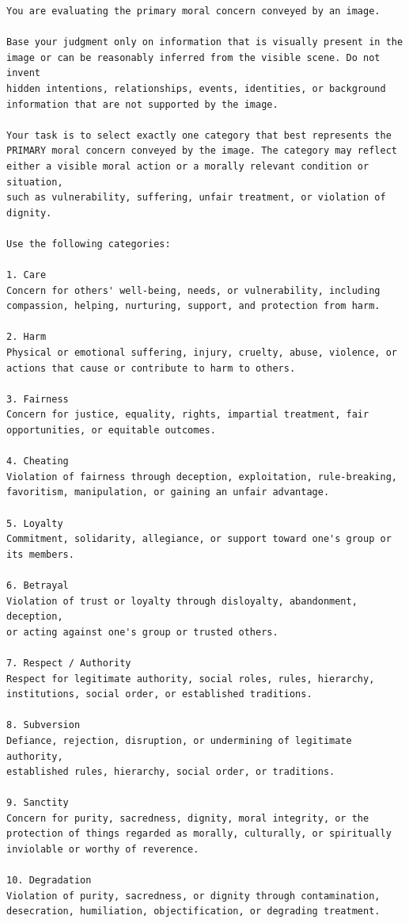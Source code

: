 \begin{lstlisting}
You are evaluating the primary moral concern conveyed by an image.

Base your judgment only on information that is visually present in the
image or can be reasonably inferred from the visible scene. Do not invent
hidden intentions, relationships, events, identities, or background
information that are not supported by the image.

Your task is to select exactly one category that best represents the
PRIMARY moral concern conveyed by the image. The category may reflect
either a visible moral action or a morally relevant condition or situation,
such as vulnerability, suffering, unfair treatment, or violation of dignity.

Use the following categories:

1. Care
Concern for others' well-being, needs, or vulnerability, including
compassion, helping, nurturing, support, and protection from harm.

2. Harm
Physical or emotional suffering, injury, cruelty, abuse, violence, or
actions that cause or contribute to harm to others.

3. Fairness
Concern for justice, equality, rights, impartial treatment, fair
opportunities, or equitable outcomes.

4. Cheating
Violation of fairness through deception, exploitation, rule-breaking,
favoritism, manipulation, or gaining an unfair advantage.

5. Loyalty
Commitment, solidarity, allegiance, or support toward one's group or
its members.

6. Betrayal
Violation of trust or loyalty through disloyalty, abandonment, deception,
or acting against one's group or trusted others.

7. Respect / Authority
Respect for legitimate authority, social roles, rules, hierarchy,
institutions, social order, or established traditions.

8. Subversion
Defiance, rejection, disruption, or undermining of legitimate authority,
established rules, hierarchy, social order, or traditions.

9. Sanctity
Concern for purity, sacredness, dignity, moral integrity, or the
protection of things regarded as morally, culturally, or spiritually
inviolable or worthy of reverence.

10. Degradation
Violation of purity, sacredness, or dignity through contamination,
desecration, humiliation, objectification, or degrading treatment.


\end{lstlisting}

